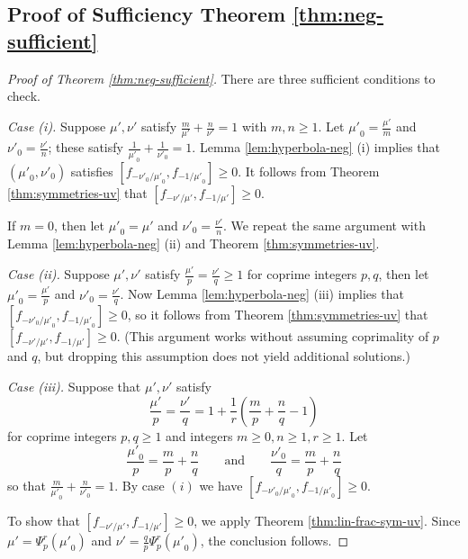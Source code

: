 \documentclass[11pt, letterpaper, reqno]{amsart}
\theoremstyle{definition}
\theoremstyle{remark}
\numberwithin{equation}{section}
\newcommand{\uu}{{\mu'}}
\newcommand{\vv}{{\nu'}}
\begin{document}
\subsection{Proof of Sufficiency Theorem \ref{thm:neg-sufficient}}
\label{sec:neg-suff-proof}

\begin{proof}[Proof of Theorem \ref{thm:neg-sufficient}]
There are three sufficient conditions to check.

{\em Case (i).}  Suppose  $\uu, \vv$ satisfy $\frac{m}{\uu} + \frac{n}{\vv} =1$ with $m,n\geq 1$.
Let $\uu_0 = \frac{\uu}{m}$ and $\vv_0 = \frac{\vv}{n}$;
these satisfy $\frac{1}{\uu_0} + \frac{1}{\vv_0} =1$. 
Lemma \ref{lem:hyperbola-neg} (i) implies that 
$(\uu_0,\vv_0)$ satisfies $[f_{-\vv_0/\uu_0}, f_{-1/\uu_0}] \geq 0$.
It follows from Theorem \ref{thm:symmetries-uv}
that $[f_{-\vv/\uu},f_{-1/\uu}]\geq 0$. %

If $m = 0$, 
then let $\uu_0 = \uu$ and $\vv_0 = \frac{\vv}{n}$.
We repeat the same argument with Lemma \ref{lem:hyperbola-neg} (ii)
and Theorem \ref{thm:symmetries-uv}.


{\em Case (ii).}  Suppose  $\uu, \vv$ satisfy $\frac{\uu}{p} = \frac{\vv}{q} \geq 1$ for 
coprime integers
$p,q$, 
then  let $\uu_0 = \frac{\uu}{p}$ and $\vv_0 = \frac{\vv}{q}$. 
Now Lemma \ref{lem:hyperbola-neg} (iii) implies that 
$[f_{-\vv_0/\uu_0}, f_{-1/\uu_0}] \geq 0$,
so it follows from Theorem \ref{thm:symmetries-uv} that
$[f_{-\vv/\uu},f_{-1/\uu}]\geq 0$. 
(This argument works without assuming coprimality of $p$ and $ q$, but
dropping this assumption does not yield additional solutions.) 


{\em Case (iii).}  Suppose that $\uu,\vv$ satisfy
\begin{equation}\label{eq:star} 
\frac{\uu}{p} = \frac{\vv}{q} = 1 + \frac{1}{r}\left(\frac{m}{p} + \frac{n}{q} - 1\right) 
\end{equation}
for coprime integers $p,q\geq 1$ and integers $m\geq 0, n\geq 1, r\geq 1$.
Let 
\[
\frac{\uu_0}{p} = \frac{m}{p} + \frac{n}{q}
\qquad\text{and}\qquad
 \frac{\vv_0}{q} = \frac{m}{p} + \frac{n}{q} 
\]
so that 
$ \frac{m}{\uu_0} + \frac{n}{\vv_0} = 1 $.
By case $(i)$ we have
$[f_{-\vv_0/\uu_0}, f_{-1/\uu_0}] \geq 0$.

To show that $[f_{-\vv/\uu},f_{-1/\uu}]\geq 0$,
we apply Theorem \ref{thm:lin-frac-sym-uv}. 
Since $\uu = \Psi_p^r(\uu_0)$ and $\vv = \frac{q}{p} \Psi_p^r(\uu_0)$,
the conclusion follows.
\end{proof}
\end{document}
